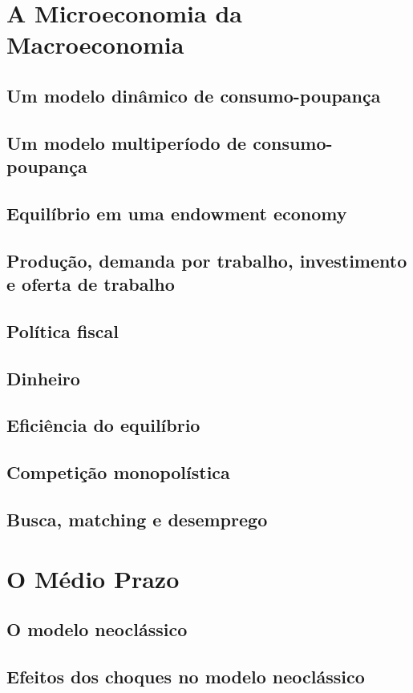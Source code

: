 \documentclass[a4paper,11pt]{book}
\theoremstyle{definition}
\begin{document}
\part{A Microeconomia da Macroeconomia}

\chapter{Um modelo dinâmico de consumo-poupança}
\chapter{Um modelo multiperíodo de consumo-poupança}
\chapter{Equilíbrio em uma endowment economy}
\chapter{Produção, demanda por trabalho, investimento e oferta de trabalho}
\chapter{Política fiscal}
\chapter{Dinheiro}
\chapter{Eficiência do equilíbrio}
\chapter{Competição monopolística}
\chapter{Busca, matching e desemprego}

\part{O Médio Prazo}

\chapter{O modelo neoclássico}
\chapter{Efeitos dos choques no modelo neoclássico}
\end{document}
